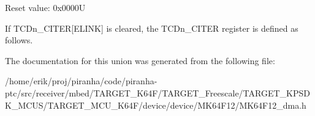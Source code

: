 Reset value\+: 0x0000U

If T\+C\+Dn\+\_\+\+C\+I\+T\+ER\mbox{[}E\+L\+I\+NK\mbox{]} is cleared, the T\+C\+Dn\+\_\+\+C\+I\+T\+ER register is defined as follows. 

The documentation for this union was generated from the following file\+:\begin{DoxyCompactItemize}
\item 
/home/erik/proj/piranha/code/piranha-\/ptc/src/receiver/mbed/\+T\+A\+R\+G\+E\+T\+\_\+\+K64\+F/\+T\+A\+R\+G\+E\+T\+\_\+\+Freescale/\+T\+A\+R\+G\+E\+T\+\_\+\+K\+P\+S\+D\+K\+\_\+\+M\+C\+U\+S/\+T\+A\+R\+G\+E\+T\+\_\+\+M\+C\+U\+\_\+\+K64\+F/device/device/\+M\+K64\+F12/M\+K64\+F12\+\_\+dma.\+h\end{DoxyCompactItemize}
